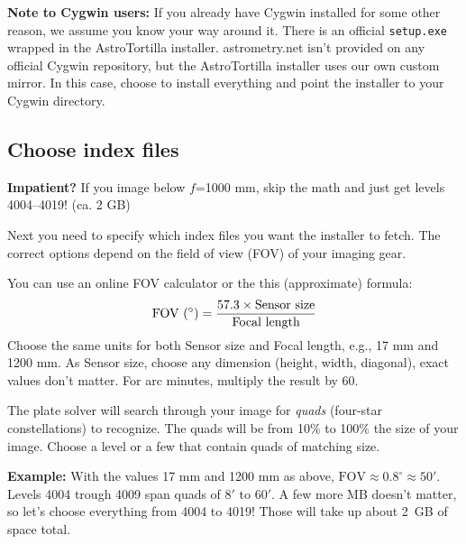 \documentclass[english]{article}
\begin{document}
{\scriptsize \textbf{Note to Cygwin users:} If you already have Cygwin installed for some other reason, we assume you know your way around it. There is an official \texttt{setup.exe} wrapped in the AstroTortilla installer. astrometry.net isn't provided on any official Cygwin repository, but the AstroTortilla installer uses our own custom mirror. In this case, choose to install everything and point the installer to your Cygwin directory.}

\subsection{Choose index files}

{\scriptsize \textbf{Impatient?} If you image below $f$=1000 mm, skip the math and just get levels 4004--4019! (ca. 2 GB)}

Next you need to specify which index files you want the installer to fetch. The correct options depend on the field of view (FOV) of your imaging gear. 

You can use an online FOV calculator or the this (approximate) formula:
\[
\text{FOV (\ensuremath{^\circ})}=\frac{57.3\times\text{Sensor size}}{\text{Focal length}}
\]
Choose the same units for both Sensor size and Focal length, e.g., 17 mm and 1200 mm. As Sensor size, choose any dimension (height, width, diagonal), exact values don't matter. For arc minutes, multiply the result by 60.

The plate solver will search through your image for \emph{quads} (four-star constellations) to recognize. The quads will be from 10\% to 100\% the size of your image. Choose a level or a few that contain quads of matching size.

\textbf{Example:} With the values 17 mm and 1200 mm as above, $\text{FOV} \approx 0.8^\circ \approx 50'$. Levels 4004 trough 4009 span quads of $8' \text{ to } 60'$. A few more MB doesn't matter, so let's choose everything from 4004 to 4019! Those will take up about 2~GB of space total.
\end{document}
